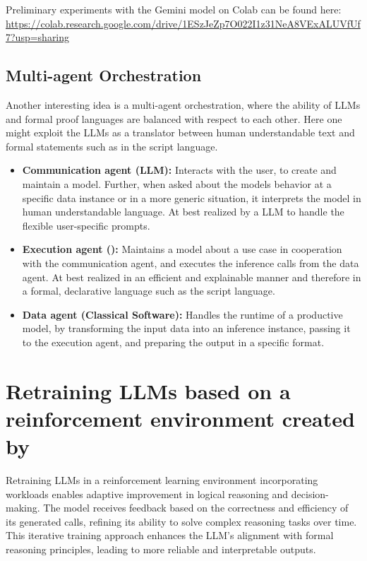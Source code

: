 \documentclass[aps,onecolumn,nofootinbib,pra]{article}
\begin{document}
Preliminary experiments with the Gemini model on Colab can be found here:
\url{https://colab.research.google.com/drive/1ESzJeZp7O022I1z31NeA8VExALUVfUf7?usp=sharing}

\subsection{Multi-agent Orchestration}

Another interesting idea is a multi-agent orchestration, where the ability of LLMs and formal proof languages are balanced with respect to each other.
Here one might exploit the LLMs as a translator between human understandable text and formal statements such as in the \tnreason script language.
\begin{itemize}
	\item \textbf{Communication agent (LLM):}
		Interacts with the user, to create and maintain a \tnreason model. 
		Further, when asked about the models behavior at a specific data instance or in a more generic situation, it interprets the model in human understandable language.
		At best realized by a LLM to handle the flexible user-specific prompts.
	\item \textbf{Execution agent (\tnreason):}
		Maintains a model about a use case in cooperation with the communication agent, and executes the inference calls from the data agent.
		At best realized in an efficient and explainable manner and therefore in a formal, declarative language such as the \tnreason script language.
	\item \textbf{Data agent (Classical Software):}
		Handles the runtime of a productive model, by transforming the input data into an inference instance, passing it to the execution agent, and preparing the output in a specific format.
\end{itemize}

\section{Retraining LLMs based on a reinforcement environment created by \tnreason}

Retraining LLMs in a reinforcement learning environment incorporating \tnreason workloads enables adaptive improvement in logical reasoning and decision-making. 
The model receives feedback based on the correctness and efficiency of its generated \tnreason calls, refining its ability to solve complex reasoning tasks over time. 
This iterative training approach enhances the LLM’s alignment with formal reasoning principles, leading to more reliable and interpretable outputs.
\end{document}
